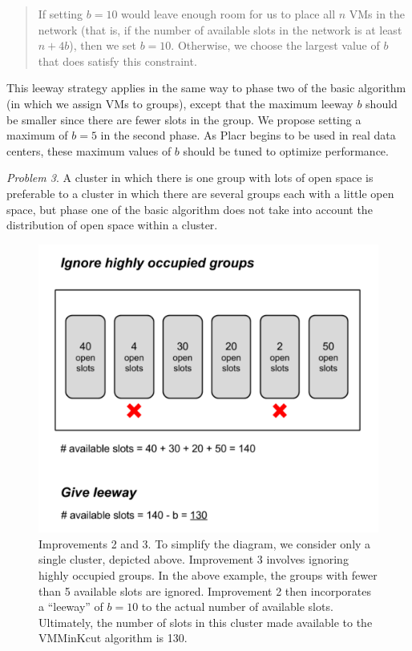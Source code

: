 \documentclass[11pt]{article}
\begin{document}
\begin{trivlist}
  \begin{quote}
If setting $b=10$ would leave enough room for us to place all $n$ VMs in the network (that is, if the number of available slots in the network is at least $n + 4b$), then we set $b=10$.  Otherwise, we choose the largest value of $b$ that does satisfy this constraint.
  \end{quote}

This leeway strategy applies in the same way to phase two of the basic algorithm (in which we assign VMs to groups), except that the maximum leeway $b$ should be smaller since there are fewer slots in the group.  We propose setting a maximum of $b=5$ in the second phase.  As Placr begins to be used in real data centers, these maximum values of $b$ should be tuned to optimize performance.

\item \textit{Problem 3}. A cluster in which there is one group with lots of open space is preferable to a cluster in which there are several groups each with a little open space, but phase one of the basic algorithm does not take into account the distribution of open space within a cluster.

\begin{figure}
  \centering
\includegraphics[scale=0.7]{occupiedgroups.png}

 \caption{ Improvements 2 and 3.  To simplify the diagram, we consider only a single cluster, depicted above.  Improvement 3 involves ignoring highly occupied groups.  In the above example, the groups with fewer than 5 available slots are ignored.  Improvement 2 then incorporates a ``leeway'' of $b=10$ to the actual number of available slots.  Ultimately, the number of slots in this cluster made available to the VMMinKcut algorithm is 130.}


\end{figure}
\end{trivlist}
\end{document}
